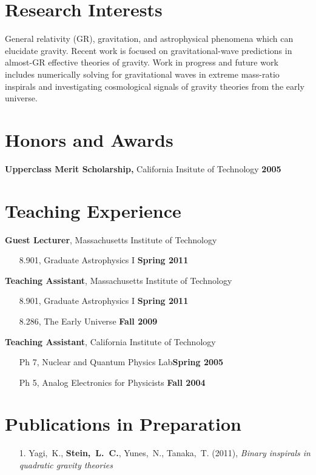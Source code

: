 \documentclass[margin,line]{res}
\begin{document}
\begin{resume}
\section{\sc Research Interests}
General relativity (GR), gravitation, and astrophysical phenomena which can
elucidate gravity. Recent work is focused on gravitational-wave predictions
in almost-GR effective theories of gravity. Work in progress and
future work includes numerically solving for gravitational waves in
extreme mass-ratio inspirals and investigating cosmological
signals of gravity theories from the early universe.

\section{\sc Honors and Awards} 
{\bf Upperclass Merit Scholarship,} California Insitute of Technology \hfill {\bf 2005}\\ 

\section{\sc Teaching Experience}
{\bf Guest Lecturer}, Massachusetts Institute of Technology
\vspace*{.05in}  
\begin{itemize}
\item[ ] 8.901, Graduate Astrophysics I \hfill {\bf Spring 2011}
\end{itemize}
{\bf Teaching Assistant}, Massachusetts Institute of Technology
\vspace*{.05in}
\begin{itemize}
\item[ ] 8.901, Graduate Astrophysics I \hfill {\bf Spring 2011}
\item[ ] 8.286, The Early Universe \hfill {\bf Fall 2009}
\end{itemize}
{\bf Teaching Assistant}, California Institute of Technology
\vspace*{.05in}
\begin{itemize}
\item[ ] Ph 7, Nuclear and Quantum Physics Lab\hfill {\bf Spring 2005}
\item[ ] Ph 5, Analog Electronics for Physicists \hfill {\bf Fall 2004}
\end{itemize}

\section{\sc Publications in Preparation}
\begin{enumerate}
\item[{1.}] Yagi,~K., {\bf Stein,~L.~C.}, Yunes,~N.,
  Tanaka,~T. (2011), {\it Binary inspirals in quadratic gravity theories}
\end{enumerate}


\end{resume}
\end{document}
